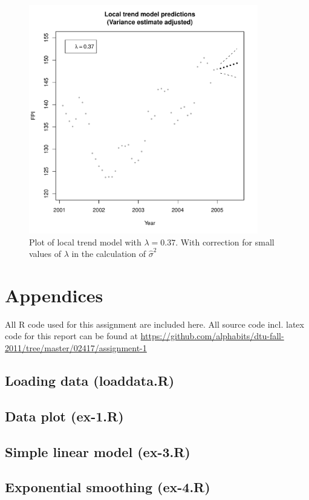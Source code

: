 \documentclass[11pt]{article}
\begin{document}
\begin{figure}
    \centering
    \includegraphics[width=100mm]{local-trend-predict-adjusted-37.pdf}
    \caption{Plot of local trend model with $\lambda=0.37$. With correction for small values of $\lambda$ in the calculation of $\widehat{\sigma}^2$}
    \label{fig:local-trend-model-adjusted-37}
\end{figure}


\pagebreak

\section*{Appendices}
All R code used for this assignment are included here. All source code incl. latex code for this report can be found at {\small\url{https://github.com/alphabits/dtu-fall-2011/tree/master/02417/assignment-1}}
\subsection*{Loading data (loaddata.R)}

\subsection*{Data plot (ex-1.R)}

\subsection*{Simple linear model (ex-3.R)}

\subsection*{Exponential smoothing (ex-4.R)}

\end{document}
